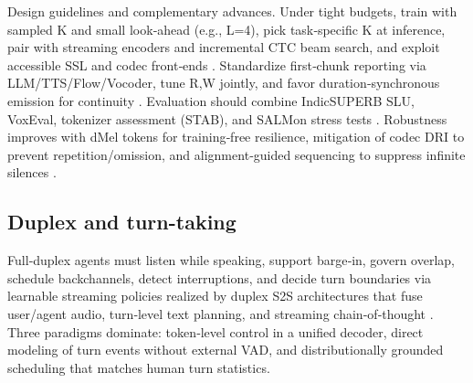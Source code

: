 \documentclass{article}
\begin{document}
Design guidelines and complementary advances. Under tight budgets, train with sampled K and small look‑ahead (e.g., L=4), pick task‑specific K at inference, pair with streaming encoders and incremental CTC beam search, and exploit accessible SSL and codec front‑ends \cite{ouyang2025cmusiwslt2025simultaneousspeechtranslati,chen2023reducingbarriersselfsupervisedlearninghu,dhawan2024codecasrtrainingperformantautomaticspeec,sheng2025syncspeechlowlatencyefficientdualstreamt}. Standardize first‑chunk reporting via LLM/TTS/Flow/Vocoder, tune R,W jointly, and favor duration‑synchronous emission for continuity \cite{fang2025llamaomni2llmbasedrealtimespokenchatbota,sheng2025syncspeechlowlatencyefficientdualstreamt}. Evaluation should combine IndicSUPERB SLU, VoxEval, tokenizer assessment (STAB), and SALMon stress tests \cite{entry2025indicsuperbspeechprocessinguniversalperf,cui2025voxevalbenchmarkingknowledgeunderstandin,vashishth2024stabspeechtokenizerassessmentbenchmark,maimon2025salmonsuiteacousticlanguagemodelevaluati}. Robustness improves with dMel tokens for training‑free resilience, mitigation of codec DRI to prevent repetition/omission, and alignment‑guided sequencing to suppress infinite silences \cite{bai2025dmelspeechtokenizationmadesimple,liu2024analyzingmitigatinginconsistencydiscrete,li2024investigatingneuralaudiocodecsspeechlang,song2024ellavstableneuralcodeclanguagemodelingal}.



\subsection{Duplex and turn-taking} \label{subsec:Duplex and turn-taking}

Full‑duplex agents must listen while speaking, support barge‑in, govern overlap, schedule backchannels, detect interruptions, and decide turn boundaries via learnable streaming policies realized by duplex S2S architectures that fuse user/agent audio, turn‑level text planning, and streaming chain‑of‑thought \cite{hu2025salmduplexefficientdirectmodelingspeechl,cui2025thinkbeforeyoutalkenhancingmeaningfuldia,guo2025streamuniachievingstreamingspeechtransla}. Three paradigms dominate: token‑level control in a unified decoder, direct modeling of turn events without external VAD, and distributionally grounded scheduling that matches human turn statistics.
\end{document}
